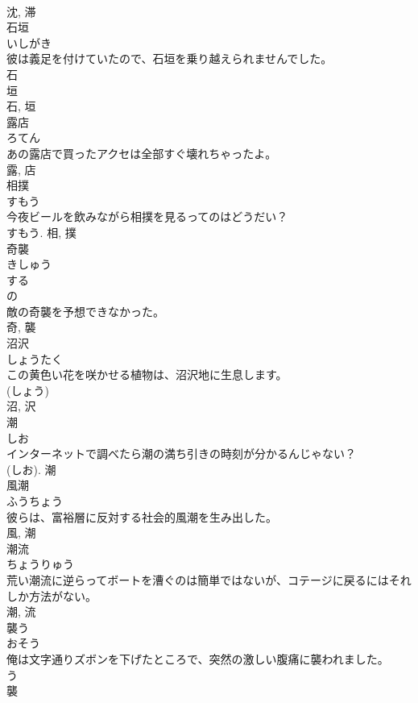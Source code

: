 \documentclass[8pt]{extreport}
\begin{document}
\begin{CJK}{UTF8}{min}
\\	沈, 滞	
\\	石垣	
\\	いしがき	
\\	彼は義足を付けていたので、石垣を乗り越えられませんでした。	
\\	石 
\\	垣 
\\	石, 垣	
\\	露店	
\\	ろてん	
\\	あの露店で買ったアクセは全部すぐ壊れちゃったよ。	
\\	露, 店	
\\	相撲	
\\	すもう	
\\	今夜ビールを飲みながら相撲を見るってのはどうだい？	
\\	すもう.	相, 撲	
\\	奇襲	
\\	きしゅう	
\\	する 
\\	の 
\\	敵の奇襲を予想できなかった。	
\\	奇, 襲	
\\	沼沢	
\\	しょうたく	
\\	この黄色い花を咲かせる植物は、沼沢地に生息します。	
\\	(しょう) 
\\	沼, 沢	
\\	潮	
\\	しお	
\\	インターネットで調べたら潮の満ち引きの時刻が分かるんじゃない？	
\\	(しお).	潮	
\\	風潮	
\\	ふうちょう	
\\	彼らは、富裕層に反対する社会的風潮を生み出した。	
\\	風, 潮	
\\	潮流	
\\	ちょうりゅう	
\\	荒い潮流に逆らってボートを漕ぐのは簡単ではないが、コテージに戻るにはそれしか方法がない。	
\\	潮, 流	
\\	襲う	
\\	おそう	
\\	俺は文字通りズボンを下げたところで、突然の激しい腹痛に襲われました。	
\\	う 
\\	襲	

\end{CJK}
\end{document}
